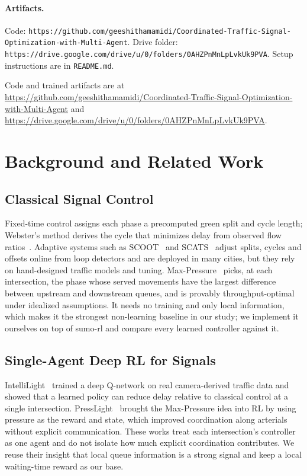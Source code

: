 \documentclass[conference]{IEEEtran}
\begin{document}
\paragraph{Artifacts.} Code: \texttt{https://github.com/geeshithamamidi/Coordinated-Traffic-Signal-Optimization-with-Multi-Agent}. Drive folder: \texttt{https://drive.google.com/drive/u/0/folders/0AHZPnMnLpLvkUk9PVA}. Setup instructions are in \texttt{README.md}.


Code and trained artifacts are at \url{https://github.com/geeshithamamidi/Coordinated-Traffic-Signal-Optimization-with-Multi-Agent} and \url{https://drive.google.com/drive/u/0/folders/0AHZPnMnLpLvkUk9PVA}.

\section{Background and Related Work}
\label{sec:related}

\subsection{Classical Signal Control}
Fixed-time control assigns each phase a precomputed green split and cycle length; Webster's method derives the cycle that minimizes delay from observed flow ratios~\cite{webster1958}. Adaptive systems such as SCOOT~\cite{hunt1981scoot} and SCATS~\cite{sims1980scats} adjust splits, cycles and offsets online from loop detectors and are deployed in many cities, but they rely on hand-designed traffic models and tuning. Max-Pressure~\cite{varaiya2013max} picks, at each intersection, the phase whose served movements have the largest difference between upstream and downstream queues, and is provably throughput-optimal under idealized assumptions. It needs no training and only local information, which makes it the strongest non-learning baseline in our study; we implement it ourselves on top of sumo-rl and compare every learned controller against it.

\subsection{Single-Agent Deep RL for Signals}
IntelliLight~\cite{wei2018intellilight} trained a deep Q-network on real camera-derived traffic data and showed that a learned policy can reduce delay relative to classical control at a single intersection. PressLight~\cite{wei2019presslight} brought the Max-Pressure idea into RL by using pressure as the reward and state, which improved coordination along arterials without explicit communication. These works treat each intersection's controller as one agent and do not isolate how much explicit coordination contributes. We reuse their insight that local queue information is a strong signal and keep a local waiting-time reward as our base.
\end{document}
